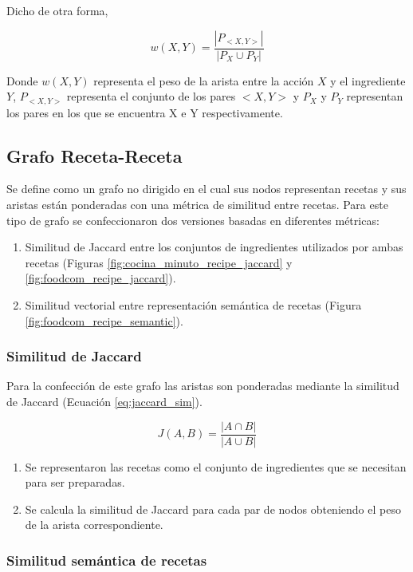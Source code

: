 \documentclass[
	a4paper, %
	10pt, %
	unnumberedsections, %
	twoside, %
]{LTJournalArticle}
\begin{document}
Dicho de otra forma,

$$w(X, Y) = \frac{|P_{<X,Y>}|}{|P_X \cup P_Y|}$$

Donde $w(X,Y)$ representa el peso de la arista entre la acción $X$ y el ingrediente $Y$, $P_{<X,Y>}$ representa 
el conjunto de los pares $<X,Y>$ y $P_X$ y $P_Y$ representan los pares en los que se encuentra X e Y 
respectivamente.


\subsection{Grafo Receta-Receta}

Se define como un grafo no dirigido en el cual sus nodos representan recetas y sus aristas
están ponderadas con una métrica de similitud entre recetas. Para este tipo de grafo se confeccionaron dos 
versiones basadas en diferentes métricas:

\begin{enumerate}
	\item Similitud de Jaccard entre los conjuntos de ingredientes utilizados por ambas recetas (Figuras \ref{fig:cocina_minuto_recipe_jaccard} y \ref{fig:foodcom_recipe_jaccard}).
	\item Similitud vectorial entre representación semántica de recetas (Figura \ref{fig:foodcom_recipe_semantic}).
\end{enumerate}

\subsubsection{Similitud de Jaccard}

Para la confección de este grafo las aristas son ponderadas mediante la similitud de Jaccard (Ecuación \ref{eq:jaccard_sim}).

\begin{equation}
	J(A, B) = \frac{|A \cap B|}{|A \cup B|}
	\label{eq:jaccard_sim}
\end{equation}

\begin{enumerate}
	\item Se representaron las recetas como el conjunto de ingredientes que se necesitan para ser preparadas.
	\item Se calcula la similitud de Jaccard para cada par de nodos obteniendo el peso de la arista correspondiente.
\end{enumerate}

\subsubsection{Similitud semántica de recetas}
\end{document}
